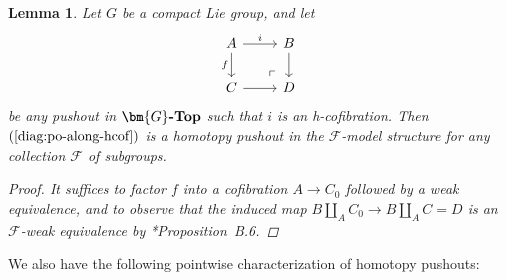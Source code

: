 \documentclass[reqno]{memo-l}
\theoremstyle{mythm}
\newtheorem{lemma}[thm]{Lemma}
\theoremstyle{definition}
\numberwithin{equation}{section}
\newcommand{\Ff}{{\mathcal{F}}}
\newcommand{\cat}[1]{\textbf{\textup{#1}}}
\begin{document}
\begin{lemma}\label{lemma:h-cof-compute-po-unbased}
    Let $G$ be a compact Lie group, and let
    \begin{equation}\label{diag:po-along-hcof}
       \begin{tikzcd}
            A\arrow[r,"i"]\arrow[d,"f"']\arrow[dr,phantom,"\ulcorner"{very near end}] & B\arrow[d]\\
            C\arrow[r] & D
        \end{tikzcd}
    \end{equation}
    be any pushout in $\cat{$\bm{G}$-Top}$ such that $i$ is an h-cofibration. Then $(\ref{diag:po-along-hcof})$ is a homotopy pushout in the $\Ff$-model structure for any collection $\Ff$ of subgroups.
    \begin{proof}
        It suffices to factor $f$ into a cofibration $A\to C_0$ followed by a weak equivalence, and to observe that the induced map $B\amalg_AC_0\to B\amalg_AC=D$ is an $\Ff$-weak equivalence by \cite{schwede2018global}*{Proposition~B.6}.
    \end{proof}
\end{lemma}

We also have the following pointwise characterization of homotopy pushouts:
\end{document}
